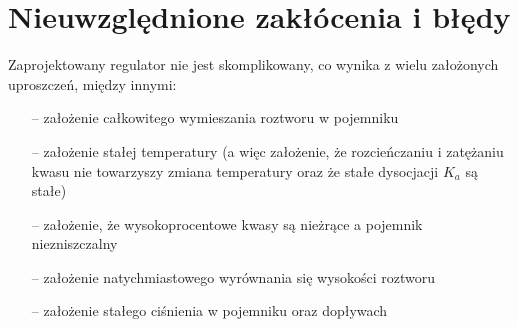 \documentclass[polish,polish,a4paper,12pt]{article}
\begin{document}
	\section{Nieuwzględnione zakłócenia i błędy}
	
	Zaprojektowany regulator nie jest skomplikowany, co wynika z wielu założonych uproszczeń, między innymi:
	
	\begin{enumerate}
		\item [--] założenie całkowitego wymieszania roztworu w pojemniku
		\item [--] założenie stałej temperatury (a więc założenie, że rozcieńczaniu i zatężaniu kwasu nie towarzyszy zmiana temperatury oraz że stałe dysocjacji $K_a$ są stałe)
		\item [--] założenie, że wysokoprocentowe kwasy są nieżrące a pojemnik niezniszczalny
		\item [--] założenie natychmiastowego wyrównania się wysokości roztworu
		\item [--] założenie stałego ciśnienia w pojemniku oraz dopływach
	\end{enumerate}
\end{document}
